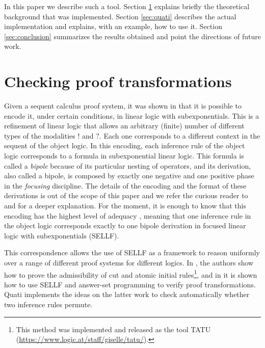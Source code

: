\documentclass{llncs}
\begin{document}
In this paper we describe such a tool. Section \ref{sec:checking} explains
briefly the theoretical background that was implemented. Section \ref{sec:quati}
describes the actual implementation and explains, with an example, how to use
it. Section \ref{sec:conclusion} summarizes the results obtained and point the
directions of future work.

\section{Checking proof transformations}
\label{sec:checking}


Given a sequent calculus proof system, it was shown in \cite{ENTCS?} that it
is possible to encode it, under certain conditions, in linear logic with
subexponentials. This is a refinement of linear logic that allows an
arbitrary (finite) number of different types of the modalities $!$ and $?$. Each
one corresponds to a different context in the sequent of the object logic. In
this encoding, each inference rule of the object logic corresponds to a
formula in subexponential linear logic. This formula is called a \emph{bipole} because of its
particular nesting of operators, and its derivation, also called a bipole, is composed by exactly one
negative and one positive phase in the \emph{focusing} discipline. The details
of the encoding and the format of these derivations is out of the scope of this
paper and we refer the curious reader to \cite{llinda} and \cite{JLC paper} for
a deeper explanation. For the moment, it is enough to know that this encoding
has the highest level of adequacy \cite{adequacy??}, meaning that one inference
rule in the object logic corresponds exactly to one bipole derivation in
focused linear logic with subexponentials (SELLF).

This correspondence allows the use of SELLF as a framework to reason
uniformly over a range of different proof systems for different logics. In
\cite{JLC?}, the authors show how to prove the admissibility of cut and atomic
initial rules\footnote{This method was implemented and released as the tool
TATU (\url{https://www.logic.at/staff/giselle/tatu/}).}, and in \cite{iclp
paper} it is shown how to use SELLF and answer-set programming to verify proof
transformations. Quati implements the ideas on the latter work to check
automatically whether two inference rules permute. 
\end{document}
